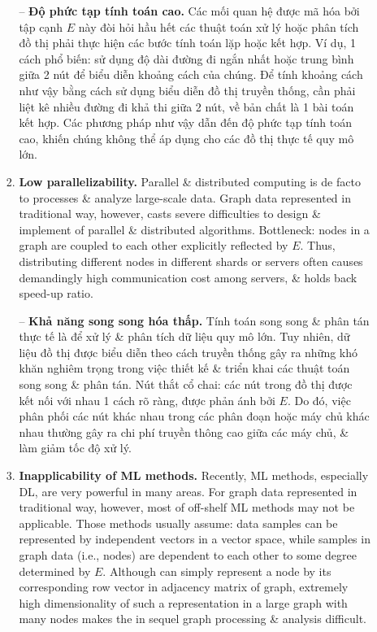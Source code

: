 \documentclass{article}
\begin{document}
\begin{itemize}
\begin{itemize}
\begin{enumerate}
            -- {\bf Độ phức tạp tính toán cao.} Các mối quan hệ được mã hóa bởi tập cạnh $E$ này đòi hỏi hầu hết các thuật toán xử lý hoặc phân tích đồ thị phải thực hiện các bước tính toán lặp hoặc kết hợp. Ví dụ, 1 cách phổ biến: sử dụng độ dài đường đi ngắn nhất hoặc trung bình giữa 2 nút để biểu diễn khoảng cách của chúng. Để tính khoảng cách như vậy bằng cách sử dụng biểu diễn đồ thị truyền thống, cần phải liệt kê nhiều đường đi khả thi giữa 2 nút, về bản chất là 1 bài toán kết hợp. Các phương pháp như vậy dẫn đến độ phức tạp tính toán cao, khiến chúng không thể áp dụng cho các đồ thị thực tế quy mô lớn.
            \item {\bf Low parallelizability.} Parallel \& distributed computing is de facto to processes \& analyze large-scale data. Graph data represented in traditional way, however, casts severe difficulties to design \& implement of parallel \& distributed algorithms. Bottleneck: nodes in a graph are coupled to each other explicitly reflected by $E$. Thus, distributing different nodes in different shards or servers often causes demandingly high communication cost among servers, \& holds back speed-up ratio.

            -- {\bf Khả năng song song hóa thấp.} Tính toán song song \& phân tán thực tế là để xử lý \& phân tích dữ liệu quy mô lớn. Tuy nhiên, dữ liệu đồ thị được biểu diễn theo cách truyền thống gây ra những khó khăn nghiêm trọng trong việc thiết kế \& triển khai các thuật toán song song \& phân tán. Nút thắt cổ chai: các nút trong đồ thị được kết nối với nhau 1 cách rõ ràng, được phản ánh bởi $E$. Do đó, việc phân phối các nút khác nhau trong các phân đoạn hoặc máy chủ khác nhau thường gây ra chi phí truyền thông cao giữa các máy chủ, \& làm giảm tốc độ xử lý.
            \item {\bf Inapplicability of ML methods.} Recently, ML methods, especially DL, are very powerful in many areas. For graph data represented in traditional way, however, most of off-shelf ML methods may not be applicable. Those methods usually assume: data samples can be represented by independent vectors in a vector space, while samples in graph data (i.e., nodes) are dependent to each other to some degree determined by $E$. Although can simply represent a node by its corresponding row vector in adjacency matrix of graph, extremely high dimensionality of such a representation in a large graph with many nodes makes the in sequel graph processing \& analysis difficult.


\end{enumerate}
\end{itemize}
\end{itemize}
\end{document}

